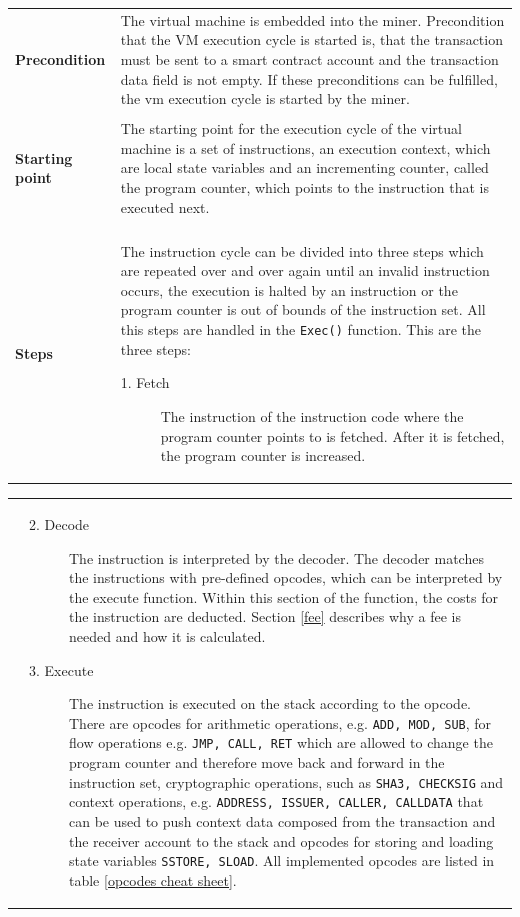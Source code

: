 \begin{tabular}[t]{ p{3cm} p{12.5cm}}
\raggedright
\textbf{Precondition} & 
The virtual machine is embedded into the miner. Precondition that the VM execution cycle is started is, that the transaction must be sent to a smart contract account and the transaction data field is not empty. If these preconditions can be fulfilled, the vm execution cycle is started by the miner. \\ \\

\textbf{Starting point} & 
The starting point for the execution cycle of the virtual machine is a set of instructions, an execution context, which are local state variables and an incrementing counter, called the program counter, which points to the instruction that is executed next. \\ \\

\textbf{Steps} &
The instruction cycle can be divided into three steps which are repeated over and over again until an invalid instruction occurs, the execution is halted by an instruction or the program counter is out of bounds of the instruction set. All this steps are handled in the \texttt{Exec()} function. This are the three steps:
\begin{description}
  \item[1. Fetch] The instruction of the instruction code where the program counter points to is fetched. After it is fetched, the program counter is increased.
    \end{description}
\end{tabular}

\begin{tabular}[t]{ p{3cm} p{12.5cm}}
\raggedright
\textbf{ } & 
\begin{description}
	\item[2. Decode] The instruction is interpreted by the decoder. The decoder matches the instructions with pre-defined opcodes, which can be interpreted by the execute function. Within this section of the function, the costs for the instruction are deducted. Section \ref{fee} describes why a fee is needed and how it is calculated.
    \item[3. Execute] The instruction is executed on the stack according to the opcode. There are opcodes for arithmetic operations, e.g. \texttt{ADD, MOD, SUB}, for flow operations e.g. \texttt{JMP, CALL, RET} which are allowed to change the program counter and therefore move back and forward in the instruction set, cryptographic operations, such as \texttt{SHA3, CHECKSIG} and context operations, e.g. \texttt{ADDRESS, ISSUER, CALLER, CALLDATA} that can be used to push context data composed from the transaction and the receiver account to the stack and opcodes for storing and loading state variables \texttt{SSTORE, SLOAD}. All implemented opcodes are listed in table \ref{opcodes cheat sheet}.
\end{description}
\end{tabular}

